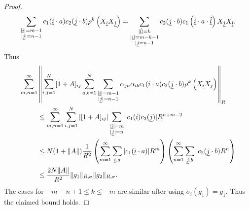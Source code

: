 \begin{proof}
	\begin{align*}
		\sum_{\substack{|\underline{i}|=m-1\\ |\underline{j}|=n-1}}  c_1(\underline{i}\cdot a)c_2(\underline{j}\cdot b)\rho^k\left( X_{\underline{i}} X_{\underline{j}}\right)=\sum_{\substack{ |\underline{\hat{l}}|=k\\ |\underline{i}|=m-k-1\\ |\underline{j}=n-1}}  c_2(\underline{j}\cdot b) c_1\left(\underline{i}\cdot a\cdot\underline{\hat{l}}\right) X_{\underline{j}} X_{\underline{\hat{l}}}.
	\end{align*}
Thus
	\begin{align*}
		\sum_{m,n=1}^\infty &\left\| \sum_{i,j=1}^N [1+A]_{ij}  \sum_{a,b=1}^N \sum_{\substack{|\underline{i}|=m-1\\ |\underline{j}|=n-1}} \alpha_{ja}\alpha_{ib} c_1(\underline{i}\cdot a)c_2(\underline{j}\cdot b)\rho^k\left( X_{\underline{i}} X_{\underline{j}}\right)\right\|_R\\
				 &\leq \sum_{m,n=1}^\infty \sum_{i,j=1}^N |[1+A]_{ij}| \sum_{\substack{ |\underline{i}|=m\\ |\underline{j}|=n}} |c_1(\underline{i}) c_2(\underline{j}) | R^{n+m-2}\\
				 &\leq N(1+\|A\|) \frac{1}{R^2}\left(\sum_{m=1}^\infty\sum_{\underline{i},a} |c_1(\underline{i}\cdot a)| R^m\right)\left(\sum_{n=1}^\infty \sum_{\underline{j},b} |c_2(\underline{j}\cdot b) R^n\right)\\
							&\leq \frac{2N\|A\|}{R^2}\|g_1\|_{R,\sigma}\|g_2\|_{R,\sigma}.
	\end{align*}
The cases for $-m-n+1\leq k \leq -m$ are similar after using $\sigma_i(g_1)=g_1$. Thus the claimed bound holds.
\end{proof}















